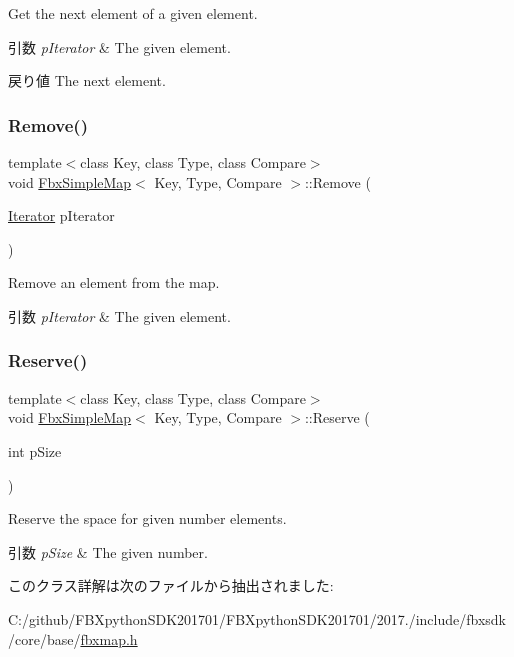 Get the next element of a given element. 
\begin{DoxyParams}{引数}
{\em p\+Iterator} & The given element. \\
\hline
\end{DoxyParams}
\begin{DoxyReturn}{戻り値}
The next element. 
\end{DoxyReturn}
\mbox{\label{class_fbx_simple_map_ab97e03572ab94e42903a9c29c7e904ef}} 
\subsubsection{\texorpdfstring{Remove()}{Remove()}}
{\footnotesize\ttfamily template$<$class Key, class Type, class Compare$>$ \\
void \hyperlink{class_fbx_simple_map}{Fbx\+Simple\+Map}$<$ Key, Type, Compare $>$\+::Remove (\begin{DoxyParamCaption}\item[{\hyperlink{class_fbx_simple_map_aaa589eb5e1ccdd11dffd018f3212e13e}{Iterator}}]{p\+Iterator }\end{DoxyParamCaption})}

Remove an element from the map. 
\begin{DoxyParams}{引数}
{\em p\+Iterator} & The given element. \\
\hline
\end{DoxyParams}
\mbox{\label{class_fbx_simple_map_a73177350fd95bfea14e39e78d077921f}} 
\subsubsection{\texorpdfstring{Reserve()}{Reserve()}}
{\footnotesize\ttfamily template$<$class Key, class Type, class Compare$>$ \\
void \hyperlink{class_fbx_simple_map}{Fbx\+Simple\+Map}$<$ Key, Type, Compare $>$\+::Reserve (\begin{DoxyParamCaption}\item[{int}]{p\+Size }\end{DoxyParamCaption})}

Reserve the space for given number elements. 
\begin{DoxyParams}{引数}
{\em p\+Size} & The given number. \\
\hline
\end{DoxyParams}


このクラス詳解は次のファイルから抽出されました\+:\begin{DoxyCompactItemize}
\item 
C\+:/github/\+F\+B\+Xpython\+S\+D\+K201701/\+F\+B\+Xpython\+S\+D\+K201701/2017./include/fbxsdk/core/base/\hyperlink{fbxmap_8h}{fbxmap.\+h}\end{DoxyCompactItemize}
